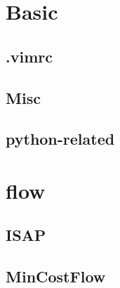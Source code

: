 \documentclass[a4paper,10pt,twocolumn,oneside]{article}
\begin{document}
\pagestyle{fancy}
\fancyfoot{}
\fancyhead[R]{\thepage}
\renewcommand{\headrulewidth}{0.4pt}
\renewcommand{\contentsname}{Contents} 

\scriptsize
\tableofcontents

\newpage

\section{Basic}
\subsection{.vimrc}


%

%

\subsection{Misc}


\subsection{python-related}


\section{flow}

\subsection{ISAP}


\subsection{MinCostFlow}

\end{document}
